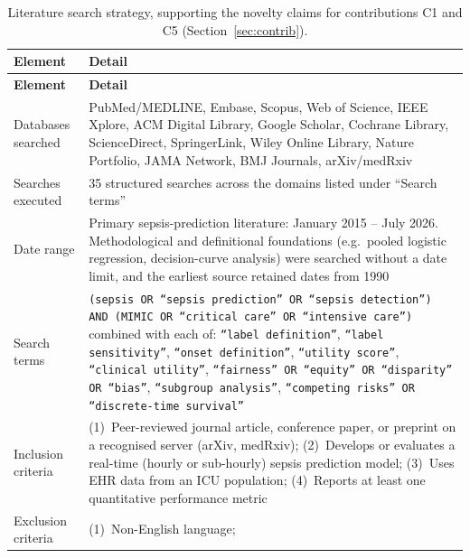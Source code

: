 {\small
\begin{longtable}{p{3.2cm}p{9.5cm}}
    \caption{Literature search strategy, supporting the novelty claims for
    contributions C1 and C5 (Section~\ref{sec:contrib}).}\label{tab:search_strategy}\\
    \toprule
    \textbf{Element} & \textbf{Detail} \\
    \midrule
    \endfirsthead
    \toprule
    \textbf{Element} & \textbf{Detail} \\
    \midrule
    \endhead
    \bottomrule
    \endfoot

        Databases searched &
        PubMed/MEDLINE, Embase, Scopus, Web of Science, IEEE Xplore,
        ACM Digital Library, Google Scholar, Cochrane Library,
        ScienceDirect, SpringerLink, Wiley Online Library, Nature
        Portfolio, JAMA Network, BMJ Journals, arXiv/medRxiv \\
        \addlinespace
        Searches executed &
        35 structured searches across the domains listed under ``Search
        terms'' \\
        \addlinespace
        Date range &
        Primary sepsis-prediction literature: January 2015 -- July 2026.
        Methodological and definitional foundations (e.g.\ pooled logistic
        regression, decision-curve analysis) were searched without a date
        limit, and the earliest source retained dates from 1990 \\
        \addlinespace
        Search terms &
        \texttt{(sepsis OR ``sepsis prediction'' OR ``sepsis detection'') AND
            (MIMIC OR ``critical care'' OR ``intensive care'')} combined with each
        of: \texttt{``label definition''}, \texttt{``label sensitivity''},
        \texttt{``onset definition''}, \texttt{``utility score''},
        \texttt{``clinical utility''}, \texttt{``fairness'' OR ``equity'' OR
        ``disparity'' OR ``bias''}, \texttt{``subgroup analysis''},
        \texttt{``competing risks'' OR ``discrete-time survival''} \\
        \addlinespace
        Inclusion criteria &
        (1)~Peer-reviewed journal article, conference paper, or preprint on a
        recognised server (arXiv, medRxiv);
        (2)~Develops or evaluates a real-time (hourly or sub-hourly) sepsis
        prediction model;
        (3)~Uses EHR data from an ICU population;
        (4)~Reports at least one quantitative performance metric \\
        \addlinespace
        Exclusion criteria &
        (1)~Non-English language;

\end{longtable}}
